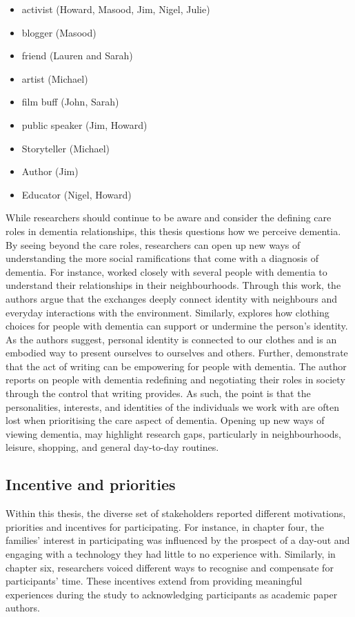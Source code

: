 \begin{itemize}
\item	activist (Howard, Masood, Jim, Nigel, Julie)
\item	blogger (Masood)
\item	friend (Lauren and Sarah)
\item	artist (Michael)
\item	film buff (John, Sarah)
\item	public speaker (Jim, Howard)
\item	Storyteller (Michael)
\item	Author (Jim)
\item	Educator (Nigel, Howard)
\end{itemize}

While researchers should continue to be aware and consider the defining care roles in dementia relationships, this thesis questions how we perceive dementia. By seeing beyond the care roles, researchers can open up new ways of understanding the more social ramifications that come with a diagnosis of dementia. For instance, \cite{kullberg2017walking} worked closely with several people with dementia to understand their relationships in their neighbourhoods. Through this work, the authors argue that the exchanges deeply connect identity with neighbours and everyday interactions with the environment. Similarly, \cite{twigg_dress_2013} explores how clothing choices for people with dementia can support or undermine the person's identity. As the authors suggest, personal identity is connected to our clothes and is an embodied way to present ourselves to ourselves and others. Further, \cite{ryan_dementia_2009} demonstrate that the act of writing can be empowering for people with dementia. The author reports on people with dementia redefining and negotiating their roles in society through the control that writing provides. As such, the point is that the personalities, interests, and identities of the individuals we work with are often lost when prioritising the care aspect of dementia. Opening up new ways of viewing dementia, may highlight research gaps, particularly in neighbourhoods, leisure, shopping, and general day-to-day routines.

\subsection{Incentive and priorities }
\label{incentive}
Within this thesis, the diverse set of stakeholders reported different motivations, priorities and incentives for participating. For instance, in chapter four, the families' interest in participating was influenced by the prospect of a day-out and engaging with a technology they had little to no experience with. Similarly, in chapter six, researchers voiced different ways to recognise and compensate for participants' time. These incentives extend from providing meaningful experiences during the study to acknowledging participants as academic paper authors. 

